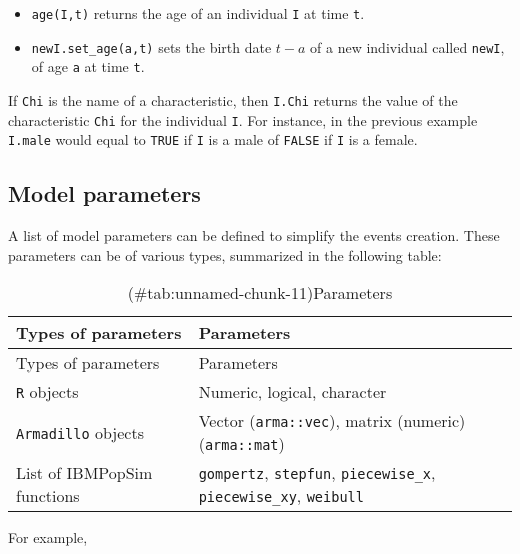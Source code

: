 \begin{itemize}
\tightlist
\item
  \texttt{age(I,t)} returns the age of an individual \texttt{I} at time \texttt{t}.
\item
  \texttt{newI.set\_age(a,t)} sets the birth date \(t-a\) of a new individual called \texttt{newI}, of age \texttt{a} at time \texttt{t}.
\end{itemize}

If \texttt{Chi} is the name of a characteristic, then \texttt{I.Chi} returns the value of the characteristic \texttt{Chi} for the individual \texttt{I}. For instance, in the previous example \texttt{I.male} would equal to \texttt{TRUE} if \texttt{I} is a male of \texttt{FALSE} if \texttt{I} is a female.

\hypertarget{params}{%
\subsection{Model parameters}\label{params}}

A list of model parameters can be defined to simplify the events creation. These parameters can be of various types, summarized in the following table:

\begin{longtable}[]{@{}ll@{}}
\caption{(\#tab:unnamed-chunk-11)Parameters}\tabularnewline
\toprule
Types of parameters & Parameters\tabularnewline
\midrule
\endfirsthead
\toprule
Types of parameters & Parameters\tabularnewline
\midrule
\endhead
\texttt{R} objects & Numeric, logical, character\tabularnewline
\texttt{Armadillo} objects & Vector (\texttt{arma::vec}), matrix (numeric) (\texttt{arma::mat})\tabularnewline
List of IBMPopSim functions & \texttt{gompertz}, \texttt{stepfun}, \texttt{piecewise\_x}, \texttt{piecewise\_xy}, \texttt{weibull}\tabularnewline
\bottomrule
\end{longtable}

For example,

\begin{Shaded}
\begin{Highlighting}[]
\StringTok{ }\NormalTok{(}\NormalTok{ =}\StringTok{ }\NormalTok{,}
                \NormalTok{ =}\StringTok{ }\NormalTok{(}\NormalTok{,}\NormalTok{))}
\end{Highlighting}
\end{Shaded}


